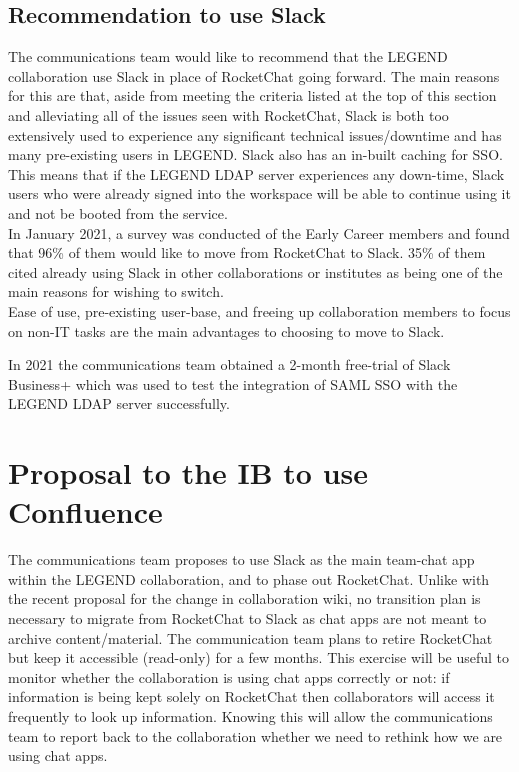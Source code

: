 \documentclass[11pt,letterpaper]{article}
\begin{document}
\subsection{Recommendation to use Slack}
The communications team would like to recommend that the LEGEND collaboration use Slack in place of RocketChat going forward. The main reasons for this are that, aside from meeting the criteria listed at the top of this section and alleviating all of the issues seen with RocketChat, Slack is both too extensively used to experience any significant technical issues/downtime and has many pre-existing users in LEGEND. Slack also has an in-built caching for SSO. This means that if the LEGEND LDAP server experiences any down-time, Slack users who were already signed into the workspace will be able to continue using it and not be booted from the service.\\
In January 2021, a survey was conducted of the Early Career members and found that 96\% of them would like to move from RocketChat to Slack. 35\% of them cited already using Slack in other collaborations or institutes as being one of the main reasons for wishing to switch. \\
Ease of use, pre-existing user-base, and freeing up collaboration members to focus on non-IT tasks are the main advantages to choosing to move to Slack.

In 2021 the communications team obtained a 2-month free-trial of Slack Business+ which was used to test the integration of SAML SSO with the LEGEND LDAP server successfully. 

\section{Proposal to the IB to use Confluence}
The communications team proposes to use Slack as the main team-chat app within the LEGEND collaboration, and to phase out RocketChat. 
Unlike with the recent proposal for the change in collaboration wiki, no transition plan is necessary to migrate from RocketChat to Slack as chat apps are not meant to archive content/material. The communication team plans to retire RocketChat but keep it accessible (read-only) for a few months. This exercise will be useful to monitor whether the collaboration is using chat apps correctly or not: if information is being kept solely on RocketChat then collaborators will access it frequently to look up information. Knowing this will allow the communications team to report back to the collaboration whether we need to rethink how we are using chat apps. 
\end{document}
